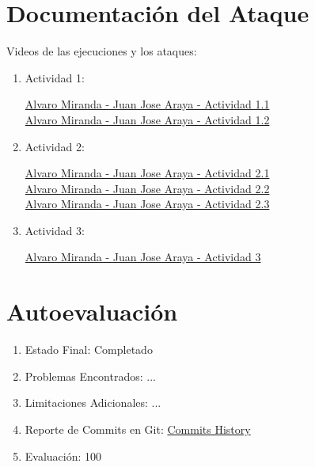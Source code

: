 \documentclass{article}
\begin{document}
\section*{Documentación del Ataque}

Videos de las ejecuciones y los ataques: \\

\begin{enumerate}
  \item Actividad 1:

  \href{https://www.loom.com/share/622ec72dc2cb4c658d06e8dee2589afd}{Alvaro Miranda - Juan Jose Araya - Actividad 1.1} \\
  
  \href{https://www.loom.com/share/7ac21ee2b903425195a60f802dd6a9c9}{Alvaro Miranda - Juan Jose Araya - Actividad 1.2} \\
  
  \item Actividad 2:
  
  \href{https://www.loom.com/share/36b82066d6d043168116ed0fc0b293b6}{Alvaro Miranda - Juan Jose Araya - Actividad 2.1} \\
  
  \href{https://www.loom.com/share/6dc3ff3fbb97469085bb2e26dcbf3220}{Alvaro Miranda - Juan Jose Araya - Actividad 2.2} \\
  
  \href{https://www.loom.com/share/466ba0ef96464f9a95a7eb8b19e8fb2f}{Alvaro Miranda - Juan Jose Araya - Actividad 2.3} \\
  
  \item Actividad 3:
  
  \href{https://www.loom.com/share/ae3e916e6bf14555b860367652aa316d}{Alvaro Miranda - Juan Jose Araya - Actividad 3} \\
  
\end{enumerate}



\section*{Autoevaluación}

\begin{enumerate}
    \item Estado Final: Completado
    \item Problemas Encontrados: ...
    \item Limitaciones Adicionales: ...
    \item Reporte de Commits en Git: \href{https://github.com/varitomirandacr/SeguridadSO_RaceCondition/commits/main}{Commits History}
    \item Evaluación: 100%
\end{enumerate}
\end{document}
